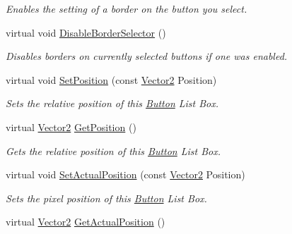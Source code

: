 \begin{DoxyCompactItemize}
\begin{DoxyCompactList}\small\item\em Enables the setting of a border on the button you select. \item\end{DoxyCompactList}\item 
\hypertarget{classphys_1_1UI_1_1ButtonListBox_ae7ea19d82a4c9a7d4262bf41e4204fce}{
virtual void \hyperlink{classphys_1_1UI_1_1ButtonListBox_ae7ea19d82a4c9a7d4262bf41e4204fce}{DisableBorderSelector} ()}
\label{d4/dd7/classphys_1_1UI_1_1ButtonListBox_ae7ea19d82a4c9a7d4262bf41e4204fce}

\begin{DoxyCompactList}\small\item\em Disables borders on currently selected buttons if one was enabled. \item\end{DoxyCompactList}\item 
virtual void \hyperlink{classphys_1_1UI_1_1ButtonListBox_a84dcb7e5d9f03ff69a10a75eec88cb1e}{SetPosition} (const \hyperlink{classphys_1_1Vector2}{Vector2} Position)
\begin{DoxyCompactList}\small\item\em Sets the relative position of this \hyperlink{classphys_1_1UI_1_1Button}{Button} List Box. \item\end{DoxyCompactList}\item 
virtual \hyperlink{classphys_1_1Vector2}{Vector2} \hyperlink{classphys_1_1UI_1_1ButtonListBox_ab7834542f8940adba8df6b1eace92e95}{GetPosition} ()
\begin{DoxyCompactList}\small\item\em Gets the relative position of this \hyperlink{classphys_1_1UI_1_1Button}{Button} List Box. \item\end{DoxyCompactList}\item 
virtual void \hyperlink{classphys_1_1UI_1_1ButtonListBox_af2b466c6268cc469fadae7664fa3ff02}{SetActualPosition} (const \hyperlink{classphys_1_1Vector2}{Vector2} Position)
\begin{DoxyCompactList}\small\item\em Sets the pixel position of this \hyperlink{classphys_1_1UI_1_1Button}{Button} List Box. \item\end{DoxyCompactList}\item 
virtual \hyperlink{classphys_1_1Vector2}{Vector2} \hyperlink{classphys_1_1UI_1_1ButtonListBox_addc5d7c6ab2a48ffa0d4b2e46c20d9a5}{GetActualPosition} ()

\end{DoxyCompactItemize}
